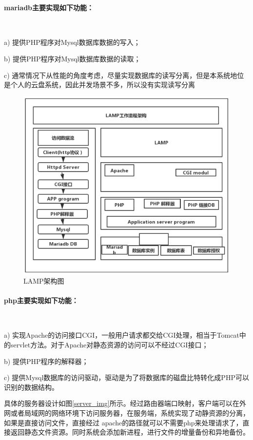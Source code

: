 \paragraph{mariadb主要实现如下功能：} $\mathbb{}$ $\mathbb{}$
\par a) 提供PHP程序对Mysql数据库数据的写入；
\par b) 提供PHP程序对Mysql数据库数据的读取；
\par c) 通常情况下从性能的角度考虑，尽量实现数据库的读写分离，但是本系统地位是个人的云盘系统，因此并发场景不多，所以没有实现读写分离
\begin{figure}[H]
    \centering
    \includegraphics[width=130mm]{./figures/lamp4.png}
    \caption{LAMP架构图}
    \label{lamp_server}
\end{figure}
\paragraph{php主要实现如下功能：} $\mathbb{}$ $\mathbb{}$
\par a) 实现Apache的访问接口CGI，一般用户请求都交给CGI处理，相当于Tomcat中的servlet方法。对于Apache对静态资源的访问可以不经过CGI接口；
\par b) 提供PHP程序的解释器；
\par c) 提供Mysql数据库的访问驱动，驱动是为了将数据库的磁盘比特转化成PHP可以识别的数据结构。

具体的服务器设计如图\ref{server_img}所示。经过路由器端口映射，客户端可以在外网或者局域网的网络环境下访问服务器，在服务端，系统实现了动静资源的分离，如果是直接访问文件，直接经过
apache的路径就可以不需要php来处理请求了，直接返回静态文件资源。同时系统会添加新进程，进行文件的增量备份和异地备份。

